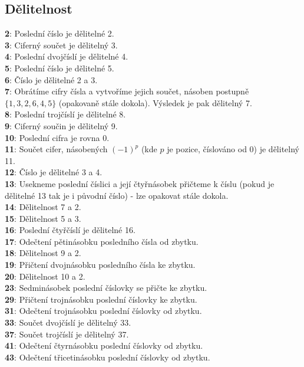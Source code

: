 \documentclass[11pt]{article}
\begin{document}
\subsection{Dělitelnost}
\textbf{2}: Poslední číslo je dělitelné 2.
\\\textbf{3}: Ciferný součet je dělitelný 3.
\\\textbf{4}: Poslední dvojčíslí je dělitelné 4.
\\\textbf{5}: Poslední číslo je dělitelné 5.
\\\textbf{6}: Číslo je dělitelné 2 a 3.
\\\textbf{7}: Obrátíme cifry čísla a vytvoříme jejich součet, násoben postupně $\{1,3,2,6,4,5\}$ (opakovaně stále dokola). Výsledek je pak dělitelný 7.
\\\textbf{8}: Poslední trojčíslí je dělitelné 8.
\\\textbf{9}: Ciferný součin je dělitelný 9.
\\\textbf{10}: Poslední cifra je rovna 0.
\\\textbf{11}: Součet cifer, násobených $(-1)^p$ (kde $p$ je pozice, číslováno od 0) je dělitelný 11.
\\\textbf{12}: Číslo je dělitelné 3 a 4.
\\\textbf{13}: Usekneme poslední číslici a její čtyřnásobek přičteme k číslu (pokud je dělitelné 13 tak je i původní číslo) - lze opakovat stále dokola.
\\\textbf{14}: Dělitelnost 7 a 2.
\\\textbf{15}: Dělitelnost 5 a 3.
\\\textbf{16}: Poslední čtyřčíslí je dělitelné 16.
\\\textbf{17}: Odečtení pětinásobku posledního čísla od zbytku.
\\\textbf{18}: Dělitelnost 9 a 2.
\\\textbf{19}: Přičtení dvojnásobku posledního čísla ke zbytku.
\\\textbf{20}: Dělitelnost 10 a 2.
\\\textbf{23}: Sedminásobek poslední číslovky se přičte ke zbytku.
\\\textbf{29}: Přičtení trojnásobku poslední číslovky ke zbytku.
\\\textbf{31}: Odečtení trojnásobku poslední číslovky od zbytku.
\\\textbf{33}: Součet dvojčíslí je dělitelný 33.
\\\textbf{37}: Součet trojčíslí je dělitelný 37.
\\\textbf{41}: Odečtení čtyrnásobku poslední číslovky od zbytku.
\\\textbf{43}: Odečtení třicetinásobku poslední číslovky od zbytku.
\end{document}
